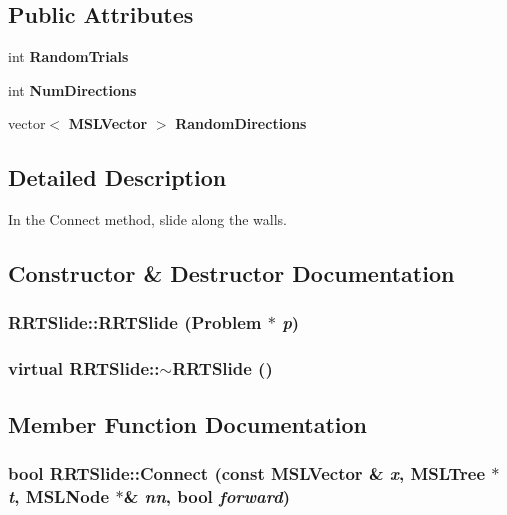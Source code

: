 \subsection*{Public Attributes}
\begin{CompactItemize}
\item 
int {\bf Random\-Trials}
\item 
int {\bf Num\-Directions}
\item 
vector$<$ {\bf MSLVector} $>$ {\bf Random\-Directions}
\end{CompactItemize}


\subsection{Detailed Description}
In the Connect method, slide along the walls.



\subsection{Constructor \& Destructor Documentation}
\subsubsection{\setlength{\rightskip}{0pt plus 5cm}RRTSlide::RRTSlide ({\bf Problem} $\ast$ {\em p})}\label{classRRTSlide_a0}


\subsubsection{\setlength{\rightskip}{0pt plus 5cm}virtual RRTSlide::$\sim$RRTSlide ()\hspace{0.3cm}{\tt  [inline, virtual]}}\label{classRRTSlide_a1}




\subsection{Member Function Documentation}
\subsubsection{\setlength{\rightskip}{0pt plus 5cm}bool RRTSlide::Connect (const {\bf MSLVector} \& {\em x}, {\bf MSLTree} $\ast$ {\em t}, {\bf MSLNode} $\ast$\& {\em nn}, bool {\em forward})\hspace{0.3cm}{\tt  [virtual]}}\label{classRRTSlide_a3}


